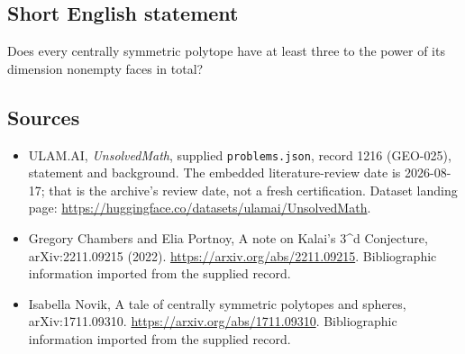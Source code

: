\documentclass[11pt,a4paper]{article}
\begin{document}
\subsection{Short English statement}

Does every centrally symmetric polytope have at least three to the power of its dimension nonempty faces in total?

\subsection{Sources}

{\small

\begin{itemize}

\item[\hypertarget{source:1216:1}{S1}] ULAM.AI, \emph{UnsolvedMath}, supplied \texttt{problems.json}, record 1216 (GEO-025), statement and background. The embedded literature-review date is 2026-08-17; that is the archive’s review date, not a fresh certification. Dataset landing page: \url{https://huggingface.co/datasets/ulamai/UnsolvedMath}.

\item[\hypertarget{source:1216:2}{S2}] Gregory Chambers and Elia Portnoy, A note on Kalai's 3\textasciicircum{}d Conjecture, arXiv:2211.09215 (2022). \url{https://arxiv.org/abs/2211.09215}. Bibliographic information imported from the supplied record.

\item[\hypertarget{source:1216:3}{S3}] Isabella Novik, A tale of centrally symmetric polytopes and spheres, arXiv:1711.09310. \url{https://arxiv.org/abs/1711.09310}. Bibliographic information imported from the supplied record.

\end{itemize}

}

\label{end:1216}
\end{document}

